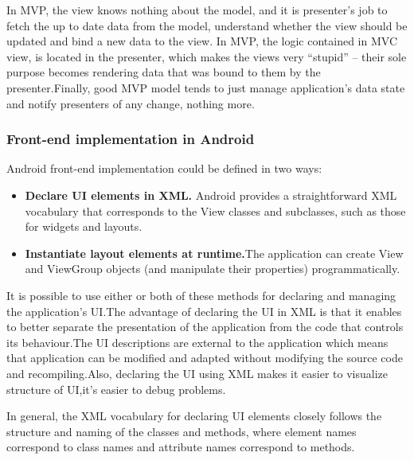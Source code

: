 In MVP, the view knows nothing about the model, and it is presenter’s job to fetch the up to date data from the model, understand whether the view should be updated and bind a new data to the view. In MVP, the logic contained in MVC view, is located in the presenter, which makes the views very “stupid” – their sole purpose becomes rendering data that was bound to them by the presenter.Finally, good MVP model tends to just manage application’s data state and notify presenters of any change, nothing more.

\subsubsection{Front-end implementation in Android}
Android front-end implementation could be defined in two ways:
\begin{itemize}
	\item \textbf{Declare UI elements in XML.} Android provides a straightforward XML vocabulary that corresponds to the View classes and subclasses, such as those for widgets and layouts.
	\item \textbf{Instantiate layout elements at runtime.}The application can create View and ViewGroup objects (and manipulate their properties) programmatically.
\end{itemize}
It is possible to use either or both of these methods for declaring and managing the application's UI.The advantage of declaring the UI in XML is that it enables to better separate the presentation of the application from the code that controls its behaviour.The UI descriptions are external to the application which means that application can be modified and adapted without modifying the source code and recompiling.Also, declaring the UI using XML makes it easier to visualize structure of UI,it's easier to debug problems.

In general, the XML vocabulary for declaring UI elements closely follows the structure and naming of the classes and methods, where element names correspond to class names and attribute names correspond to methods. \cite{Android XML} 
